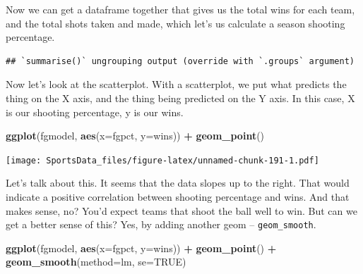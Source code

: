 \documentclass[
]{book}
\newenvironment{Shaded}{\begin{snugshade}}{\end{snugshade}}
\newcommand{\DataTypeTok}[1]{\textcolor[rgb]{0.13,0.29,0.53}{#1}}
\newcommand{\KeywordTok}[1]{\textcolor[rgb]{0.13,0.29,0.53}{\textbf{#1}}}
\newcommand{\NormalTok}[1]{#1}
\newcommand{\OperatorTok}[1]{\textcolor[rgb]{0.81,0.36,0.00}{\textbf{#1}}}
\newcommand{\OtherTok}[1]{\textcolor[rgb]{0.56,0.35,0.01}{#1}}
\newcommand{\StringTok}[1]{\textcolor[rgb]{0.31,0.60,0.02}{#1}}
\begin{document}
Now we can get a dataframe together that gives us the total wins for each team, and the total shots taken and made, which let's us calculate a season shooting percentage.

\begin{Shaded}
\end{Shaded}

\begin{verbatim}
## `summarise()` ungrouping output (override with `.groups` argument)
\end{verbatim}

Now let's look at the scatterplot. With a scatterplot, we put what predicts the thing on the X axis, and the thing being predicted on the Y axis. In this case, X is our shooting percentage, y is our wins.

\begin{Shaded}
\begin{Highlighting}[]
\KeywordTok{ggplot}\NormalTok{(fgmodel, }\KeywordTok{aes}\NormalTok{(}\DataTypeTok{x=}\NormalTok{fgpct, }\DataTypeTok{y=}\NormalTok{wins)) }\OperatorTok{+}\StringTok{ }\KeywordTok{geom_point}\NormalTok{()}
\end{Highlighting}
\end{Shaded}

\texttt{[image: SportsData\_files/figure-latex/unnamed-chunk-191-1.pdf]}

Let's talk about this. It seems that the data slopes up to the right. That would indicate a positive correlation between shooting percentage and wins. And that makes sense, no? You'd expect teams that shoot the ball well to win. But can we get a better sense of this? Yes, by adding another geom -- \texttt{geom\_smooth}.

\begin{Shaded}
\begin{Highlighting}[]
\KeywordTok{ggplot}\NormalTok{(fgmodel, }\KeywordTok{aes}\NormalTok{(}\DataTypeTok{x=}\NormalTok{fgpct, }\DataTypeTok{y=}\NormalTok{wins)) }\OperatorTok{+}\StringTok{ }\KeywordTok{geom_point}\NormalTok{() }\OperatorTok{+}\StringTok{ }\KeywordTok{geom_smooth}\NormalTok{(}\DataTypeTok{method=}\NormalTok{lm, }\DataTypeTok{se=}\OtherTok{TRUE}\NormalTok{)}
\end{Highlighting}
\end{Shaded}
\end{document}
